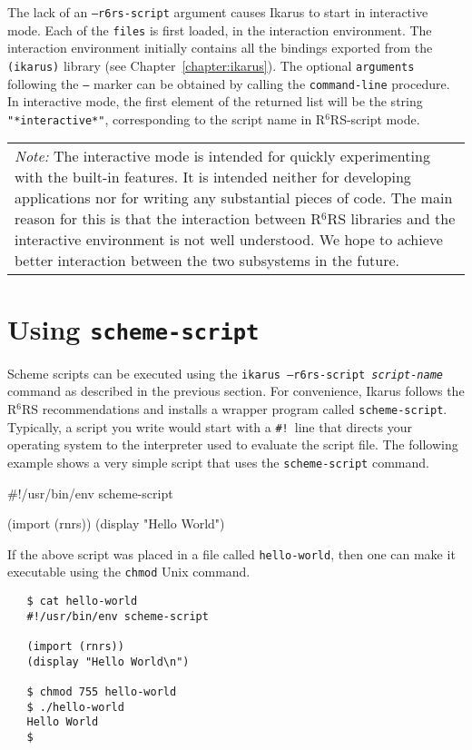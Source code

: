 \documentclass[onecolumn, 12pt, twoside, openright, dvipdfm]{book}
\newcommand{\rnrs}[1]{R$^{\mathrm{#1}}$RS}
\newcommand{\BoxedText}[2]{
  \vspace{.05in}
  \begin{center}
    \begin{tabular}{|p{4.6in}|} {\large \emph{#1}} #2 \end{tabular}
  \end{center}
  \vspace{.05in}
}
\begin{document}
\begin{itemize}
The lack of an \texttt{--r6rs-script} argument causes Ikarus to
start in interactive mode.  Each of the \texttt{files} is first
loaded, in the interaction environment.  The interaction environment
initially contains all the bindings exported from the
\texttt{(ikarus)} library (see Chapter~\ref{chapter:ikarus}).  The
optional \texttt{arguments} following the \texttt{--} marker can be
obtained by calling the \texttt{command-line} procedure.  In
interactive mode, the first element of the returned list will be the
string \texttt{"*interactive*"}, corresponding to the script name in
\rnrs{6}-script mode.


\BoxedText{Note:}{The interactive mode is intended for quickly
experimenting with the built-in features.  It is intended neither
for developing applications nor for writing any substantial pieces
of code.  The main reason for this is that the interaction between
\rnrs{6} libraries and the interactive environment is not well
understood.  We hope to achieve better interaction between the two
subsystems in the future.}

\end{itemize}

\section{Using \texttt{scheme-script}}

Scheme scripts can be executed using the
\texttt{ikarus~--r6rs-script~\textit{script-name}} command as
described in the previous section.  For convenience, Ikarus
follows the \rnrs{6} recommendations and installs a wrapper program
called \texttt{scheme-script}.  Typically, a script you write would
start with a \texttt{\#!}\ line that directs your operating system
to the interpreter used to evaluate the script file.  The following
example shows a very simple script that uses the
\texttt{scheme-script} command.

\begin{CodeInline}
#!/usr/bin/env scheme-script

(import (rnrs))
(display "Hello World\n")
\end{CodeInline}

If the above script was placed in a file called
\texttt{hello-world}, then one can make it executable using the
\texttt{chmod} Unix command.

\begin{verbatim}
   $ cat hello-world
   #!/usr/bin/env scheme-script
   
   (import (rnrs))
   (display "Hello World\n")
   
   $ chmod 755 hello-world
   $ ./hello-world
   Hello World
   $
\end{verbatim}
\end{document}
